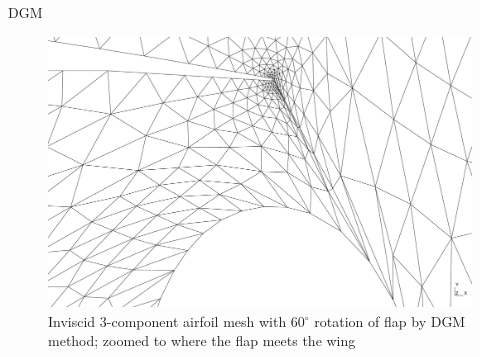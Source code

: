 \documentclass[t,12pt]{beamer}
\begin{document}
\begin{frame}{DGM}
	\begin{figure}[!h]
		\centering
		\includegraphics[scale=0.17]{wing60-dg-ms_zoomed}
		\caption{Inviscid 3-component airfoil mesh with 60$^\circ$ rotation of flap by DGM method; zoomed to where the flap meets the wing}
		\label{fig:wing-inviscid-dg-ms-zoomed}
	\end{figure}
\end{frame}
\end{document}
